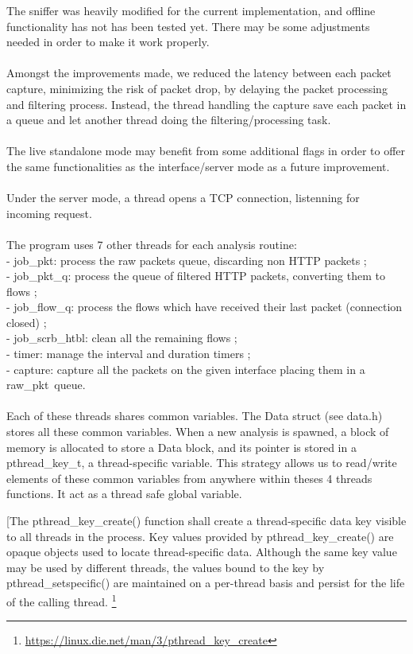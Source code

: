 \documentclass[12pt,hidelinks]{article}
\begin{document}
The sniffer was heavily modified for the current implementation, and offline functionality has not has been tested yet. 
There may be some adjustments needed in order to make it work properly. \\
\\
Amongst the improvements made, we reduced the latency between each packet capture, minimizing the risk of packet drop, by delaying the packet processing and filtering process.
Instead, the thread handling the capture save each packet in a queue and let another thread doing the filtering/processing task. \\
\\
The live standalone mode may benefit from some additional flags in order to offer the same functionalities as the interface/server mode as a future improvement. \\
\\
Under the server mode, a thread opens a TCP connection, listenning for incoming request. \\
\\
The program uses 7 other threads for each analysis routine: \\
- job\_pkt: process the raw packets queue, discarding non HTTP packets ; \\
- job\_pkt\_q: process the queue of filtered HTTP packets, converting them to flows ; \\
- job\_flow\_q: process the flows which have received their last packet (connection closed) ; \\
- job\_scrb\_htbl: clean all the remaining flows ; \\
- timer: manage the interval and duration timers ; \\
- capture: capture all the packets on the given interface placing them in a raw\_pkt\ queue. \\
\\
Each of these threads shares common variables. 
The Data struct (see data.h) stores all these common variables. When a new analysis is spawned, a block of memory is allocated to store a Data block, and its pointer is stored in a pthread\_key\_t, a thread-specific variable.
This strategy allows us to read/write elements of these common variables from anywhere within theses 4 threads functions. It act as a thread safe global variable.
    
\vspace{1cm}	
\begin{DashedDefinition}{}
[The pthread\_key\_create() function shall create a thread-specific data key visible to all threads in the process. 
Key values provided by pthread\_key\_create() are opaque objects used to locate thread-specific data. 
Although the same key value may be used by different threads, the values bound to the key by pthread\_setspecific() are maintained on a per-thread basis and persist for the life of the calling thread.
\footnote[0]{\url{https://linux.die.net/man/3/pthread_key_create}}
\end{DashedDefinition}
\end{document}
